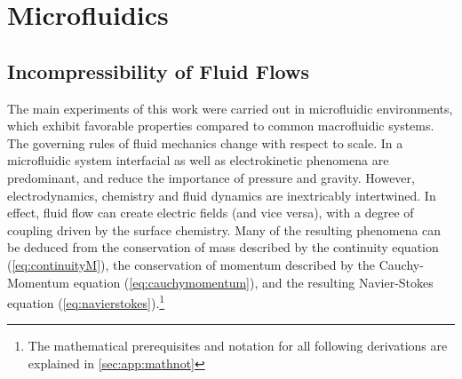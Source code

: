 \section{Microfluidics}

\subsection{Incompressibility of Fluid Flows}

\label{sec:theo:incomp}

The main experiments of this work were carried out in microfluidic environments, which exhibit favorable properties compared to common macrofluidic systems. The governing rules of fluid mechanics change with respect to scale. In a microfluidic system interfacial as well as electrokinetic phenomena are predominant, and reduce the importance of pressure and gravity.\cite{lit:fluidic:kirby} However, electrodynamics, chemistry and fluid dynamics are inextricably intertwined. In effect, fluid flow can create electric fields (and vice versa), with a degree of coupling driven by the surface chemistry. Many of the resulting phenomena can be deduced from the conservation of mass described by the continuity equation (\cref{eq:continuityM}), the conservation of momentum described by the Cauchy-Momentum equation (\cref{eq:cauchymomentum}), and the resulting Navier-Stokes equation (\cref{eq:navierstokes}).\footnote{The mathematical prerequisites and notation for all following derivations are explained in \cref{sec:app:mathnot}}

